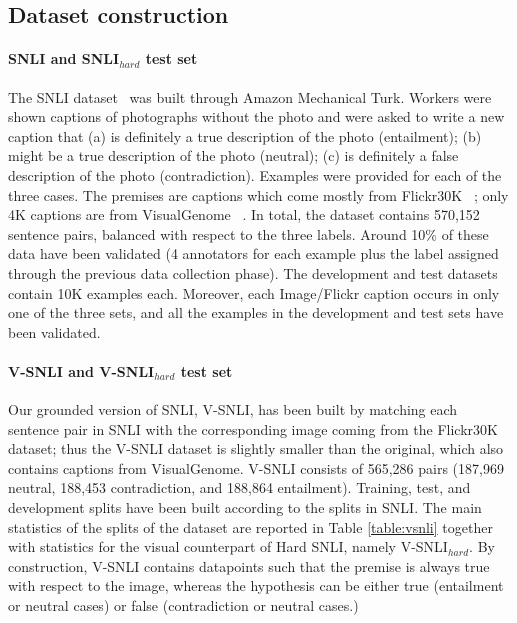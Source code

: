 \documentclass[11pt]{article}
\begin{document}
\subsection{Dataset construction}

\paragraph{SNLI and SNLI$_{hard}$ test set} The SNLI dataset~\cite{snli:emnlp2015} 
was
built through Amazon
Mechanical Turk. Workers were shown captions of photographs 
without the photo
and were asked to write a new caption that (a) is definitely  a true description of the photo (entailment); (b) might be
a true description of the photo (neutral); (c) is definitely a false
description of the photo (contradiction). Examples were provided
for each of the three cases.
The premises are captions which come mostly from
Flickr30K ~\cite{youn:from14}; only 4K captions are from
VisualGenome ~\cite{kris:visu17}. In total, the dataset contains
570,152 sentence pairs, balanced with respect to the three
labels. Around 10\% of these data have been validated (4 annotators
for each example plus the label assigned through the previous data
collection phase). The development and test datasets contain 10K
examples each. Moreover, each Image/Flickr caption occurs in only one of the three
sets, and all the examples in the development and test sets have been
validated.

\paragraph{V-SNLI and V-SNLI$_{hard}$ test set} Our grounded version of SNLI, V-SNLI,
has been built by matching each sentence pair in SNLI with the
corresponding image coming from the Flickr30K dataset; thus the V-SNLI
dataset is slightly smaller than the original, which also contains
captions from VisualGenome. V-SNLI consists of 565,286
pairs (187,969 neutral, 188,453 contradiction, and 188,864
entailment). Training, test, and development splits have been built
according to the splits in SNLI. The main statistics of
the splits of the dataset are reported in Table \ref{table:vsnli}
together with statistics for the visual counterpart of Hard SNLI, namely
V-SNLI$_{hard}$. By construction, V-SNLI contains datapoints such that
the premise is always true with respect to the image, whereas the hypothesis
can be either true (entailment or neutral cases) or false
(contradiction or neutral cases.)
\end{document}
